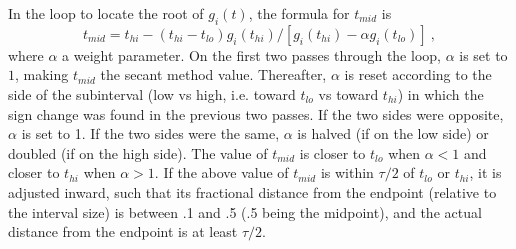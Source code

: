 In the loop to locate the root of $g_i(t)$, the formula for $t_{mid}$
is
\[ t_{mid} = t_{hi} - (t_{hi} - t_{lo})
             g_i(t_{hi}) / [g_i(t_{hi}) - \alpha g_i(t_{lo})] ~, \] 
where $\alpha$ a weight parameter.  On the first two passes through
the loop, $\alpha$ is set to $1$, making $t_{mid}$ the secant method
value.  Thereafter, $\alpha$ is reset according to the side of the
subinterval (low vs high, i.e. toward $t_{lo}$ vs toward $t_{hi}$)
in which the sign change was found in the previous two passes.  If the
two sides were opposite, $\alpha$ is set to 1.  If the two sides were
the same, $\alpha$ is halved (if on the low side) or doubled (if on
the high side).  The value of $t_{mid}$ is closer to $t_{lo}$ when
$\alpha < 1$ and closer to $t_{hi}$ when $\alpha > 1$.  If the above
value of $t_{mid}$ is within $\tau/2$ of $t_{lo}$ or $t_{hi}$, it is
adjusted inward, such that its fractional distance from the endpoint
(relative to the interval size) is between .1 and .5 (.5 being the
midpoint), and the actual distance from the endpoint is at least
$\tau/2$.
